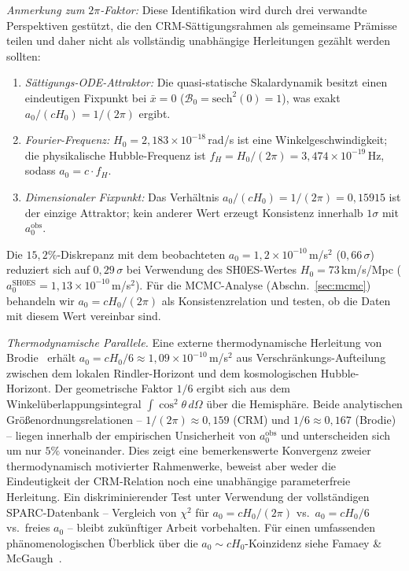\documentclass[aps,prd,twocolumn,superscriptaddress,nofootinbib]{revtex4-2}
\begin{document}
\textit{Anmerkung zum $2\pi$-Faktor:} Diese Identifikation wird durch drei verwandte Perspektiven gest\"utzt, die den CRM-S\"attigungsrahmen als gemeinsame Pr\"amisse teilen und daher nicht als vollst\"andig unabh\"angige Herleitungen gez\"ahlt werden sollten:
\begin{enumerate}
\item \textit{S\"attigungs-ODE-Attraktor:} Die quasi-statische Skalardynamik besitzt einen eindeutigen Fixpunkt bei $\bar{x} = 0$ ($\mathcal{B}_0 = \mathrm{sech}^2(0) = 1$), was exakt $a_0/(cH_0) = 1/(2\pi)$ ergibt.
\item \textit{Fourier-Frequenz:} $H_0 = 2{,}183 \times 10^{-18}$\,rad/s ist eine Winkelgeschwindigkeit; die physikalische Hubble-Frequenz ist $f_H = H_0/(2\pi) = 3{,}474 \times 10^{-19}$\,Hz, sodass $a_0 = c \cdot f_H$.
\item \textit{Dimensionaler Fixpunkt:} Das Verh\"altnis $a_0/(cH_0) = 1/(2\pi) = 0{,}15915$ ist der einzige Attraktor; kein anderer Wert erzeugt Konsistenz innerhalb $1\sigma$ mit $a_0^{\mathrm{obs}}$.
\end{enumerate}
Die $15{,}2\%$-Diskrepanz mit dem beobachteten $a_0 = 1{,}2 \times 10^{-10}$\,m/s$^2$ ($0{,}66\,\sigma$) reduziert sich auf $0{,}29\,\sigma$ bei Verwendung des SH0ES-Wertes $H_0 = 73$\,km/s/Mpc ($a_0^{\mathrm{SH0ES}} = 1{,}13 \times 10^{-10}$\,m/s$^2$). F\"ur die MCMC-Analyse (Abschn.~\ref{sec:mcmc}) behandeln wir $a_0 = cH_0/(2\pi)$ als Konsistenzrelation und testen, ob die Daten mit diesem Wert vereinbar sind.

\textit{Thermodynamische Parallele.} Eine externe thermodynamische Herleitung von Brodie~\cite{Brodie2026} erh\"alt $a_0 = cH_0/6 \approx 1{,}09 \times 10^{-10}$\,m/s$^2$ aus Verschr\"ankungs-Aufteilung zwischen dem lokalen Rindler-Horizont und dem kosmologischen Hubble-Horizont. Der geometrische Faktor $1/6$ ergibt sich aus dem Winkel\"uberlappungsintegral $\int \cos^2\theta\,d\Omega$ \"uber die Hemisph\"are. Beide analytischen Gr\"o\ss{}enordnungsrelationen -- $1/(2\pi) \approx 0{,}159$ (CRM) und $1/6 \approx 0{,}167$ (Brodie) -- liegen innerhalb der empirischen Unsicherheit von $a_0^{\mathrm{obs}}$ und unterscheiden sich um nur $5\%$ voneinander. Dies zeigt eine bemerkenswerte Konvergenz zweier thermodynamisch motivierter Rahmenwerke, beweist aber weder die Eindeutigkeit der CRM-Relation noch eine unabh\"angige parameterfreie Herleitung. Ein diskriminierender Test unter Verwendung der vollst\"andigen SPARC-Datenbank -- Vergleich von $\chi^2$ f\"ur $a_0 = cH_0/(2\pi)$ vs.\ $a_0 = cH_0/6$ vs.\ freies $a_0$ -- bleibt zuk\"unftiger Arbeit vorbehalten. F\"ur einen umfassenden ph\"anomenologischen \"Uberblick \"uber die $a_0 \sim cH_0$-Koinzidenz siehe Famaey \& McGaugh~\cite{FamaeyMcGaugh2012}.
\end{document}
